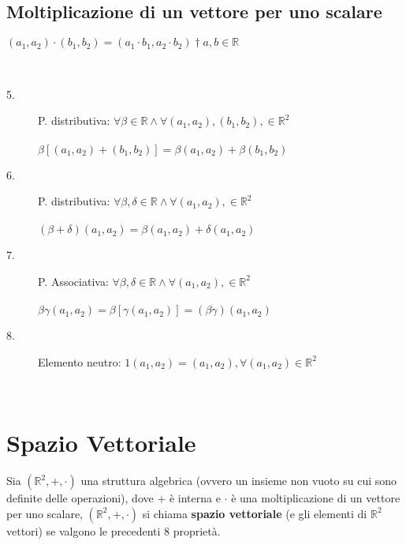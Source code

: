 \subsection{Moltiplicazione di un vettore per uno scalare}

\begin{definizione}
	$(a_{1}, a_{2})\cdot(b_{1},b_{2})=(a_{1}\cdot b_{1}, a_{2}\cdot b_{2})\dagger a,b\in \mathbb{R}$
\end{definizione}
\begin{nota}
	\phantom{}\\
	\begin{description}
		\item[5.] P. distributiva: $\forall \beta\in \mathbb{R} \wedge \forall (a_{1}, a_{2}),(b_{1}, b_{2}), \in \mathbb{R}^{2}$\\\\
		\phantom{texttexttextt}$\beta[(a_{1}, a_{2})+(b_{1}, b_{2})]=\beta(a_{1}, a_{2})+\beta(b_{1}, b_{2})$\\
		\item[6.] P. distributiva: $\forall \beta,\delta\in \mathbb{R} \wedge \forall (a_{1}, a_{2}), \in \mathbb{R}^{2}$\\\\
		\phantom{texttexttextt}$(\beta+\delta)(a_{1}, a_{2})=\beta(a_{1}, a_{2})+\delta(a_{1}, a_{2})$\\
		\item[7.] P. Associativa: $\forall \beta,\delta\in \mathbb{R} \wedge \forall (a_{1}, a_{2}), \in \mathbb{R}^{2}$\\\\
		\phantom{texttexttextt}$\beta\gamma(a_{1}, a_{2})=\beta[\gamma(a_{1}, a_{2})]=(\beta\gamma)(a_{1}, a_{2})$\\
		\item[8.] Elemento neutro: $1(a_{1}, a_{2})=(a_{1}, a_{2}), \forall(a_{1}, a_{2})\in\mathbb{R}^{2}$
	\end{description}
\end{nota}
\leavevmode\\
\section{Spazio Vettoriale}

Sia $(\mathbb{R}^{2},+,\cdot)$ una struttura algebrica (ovvero un insieme non vuoto su cui sono definite delle operazioni), dove $+$ è interna e $\cdot$ è una moltiplicazione di un vettore per uno scalare, $(\mathbb{R}^{2},+,\cdot)$ si chiama \textbf{spazio vettoriale} (e gli elementi di $\mathbb{R}^{2}$ vettori) se valgono le precedenti 8 proprietà.

